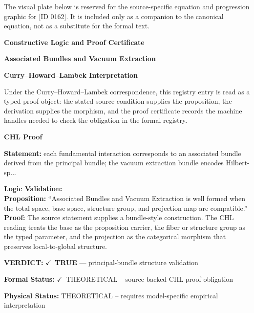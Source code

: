 \begingroup\footnotesize\sloppy
The visual plate below is reserved for the source-specific equation and progression graphic for [ID 0162]. It is included only as a companion to the canonical equation, not as a substitute for the formal text.
\par\endgroup
\ifTZPDarkEdition
{}
\fi

\clearpage
\begingroup\tzpsupportsetup
\noindent\textbf{\fontsize{10.8pt}{12.8pt}\selectfont [ID 0162] Constructive Logic and Proof Certificate}\par
\noindent\textbf{\fontsize{10pt}{12pt}\selectfont Associated Bundles and Vacuum Extraction}\par
\vspace{0.45em}
\begingroup
\footnotesize
\setlength{\parskip}{0.22em}
\setlength{\parindent}{0pt}
\noindent\textbf{Curry--Howard--Lambek Interpretation}\par
Under the Curry--Howard--Lambek correspondence, this registry entry is read as a typed proof
object: the stated source condition supplies the proposition, the derivation supplies the
morphism, and the proof certificate records the machine handles needed to check the obligation
in the formal registry.

\vspace{0.45em}
\noindent\textbf{CHL Proof}\par
\textbf{Statement:} each fundamental interaction corresponds to an associated bundle derived from the
principal bundle; the vacuum extraction bundle encodes Hilbert-sp...

\textbf{Logic Validation:}\\
\textbf{Proposition:} ``Associated Bundles and Vacuum Extraction is well formed when the total space, base
space, structure group, and projection map are compatible.''\\
\textbf{Proof:} The source statement supplies a bundle-style construction. The CHL reading treats the
base as the proposition carrier, the fiber or structure group as the typed parameter,
and the projection as the categorical morphism that preserves local-to-global structure.

\textbf{VERDICT:} \ensuremath{\checkmark}\ \textbf{TRUE} --- principal-bundle structure validation

\textbf{Formal Status:} \ensuremath{\checkmark}\ THEORETICAL -- source-backed CHL proof obligation

\textbf{Physical Status:} THEORETICAL -- requires model-specific empirical interpretation
\par\vspace{0.45em}
\par
\ifTZPDarkEdition
{}
\fi
\endgroup
\endgroup
